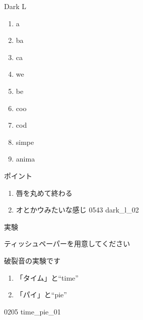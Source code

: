 \documentclass[aspectratio=169, xcolor={dvipsnames,table}]{beamer}
\begin{document}
\begin{frame}[plain]{Dark L}
  \large

  \begin{enumerate}
    \item a

    \item ba

    \item ca

    \item we

    \item be

    \item coo

    \item cod

    \item simpe

    \item anima
  \end{enumerate}

  \vspace*{10pt}

  \small ポイント

  \begin{enumerate}
    \item 唇を丸めて終わる

    \item オとかウみたいな感じ \hfill{\tiny 0543}\,{\scriptsize {}}\,{\tiny dark\_l\_02}
  \end{enumerate}
\end{frame}
\begin{frame}[plain]{実験}
  \large

  ティッシュペーパーを用意してください\pause

  \bigskip

  破裂音の実験です\pause

  \bigskip

  \begin{enumerate}
    \item 「タイム」と``time''\hspace{30pt}\pause

    \item 「パイ」と``pie''\hspace{49pt}
  \end{enumerate}

  \hfill{\tiny 0205}\,{\scriptsize {}}\,{\tiny time\_pie\_01}
\end{frame}
\end{document}
